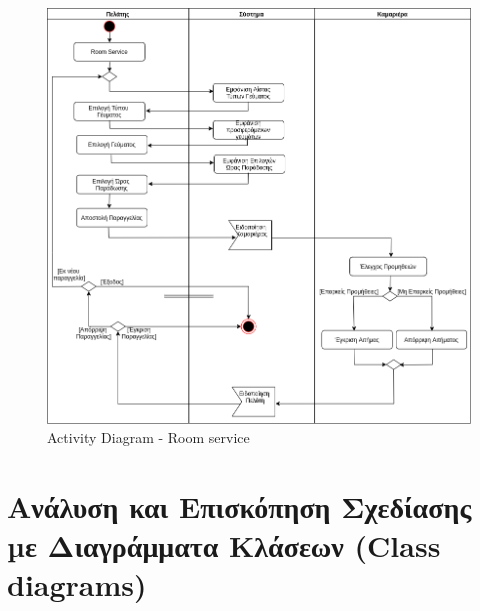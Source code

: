 \begin{figure}[H]
	\centering
	\includegraphics[width=1\textwidth]{Images/Activity-Room service}
		\caption{Activity Diagram - Room service}
		\label{Activity - Room service}
\end{figure}
\clearpage

\section{Ανάλυση και Επισκόπηση Σχεδίασης µε Διαγράμματα Κλάσεων (Class diagrams)}
\clearpage


